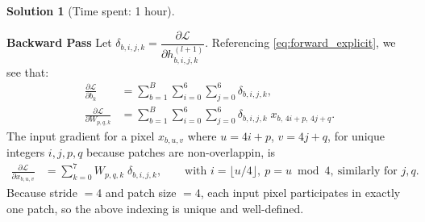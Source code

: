 \documentclass[11pt, reqno, letterpaper, twoside]{amsart}
\theoremstyle{plain}
\theoremstyle{definition}
\newtheorem{solution}[theorem]{Solution}
\begin{document}
\begin{solution}[Time spent: 1 hour]
\begin{enumerate}
\noindent \textbf{Backward Pass }
Let $\delta_{b,i,j,k}=\dfrac{\partial \mathcal{L}}{\partial h^{(l+1)}_{b,i,j,k}}$. Referencing \eqref{eq:forward_explicit}, we see that: 
\begin{align}
\frac{\partial \mathcal{L}}{\partial b_k}
&= \sum_{b=1}^{B}\sum_{i=0}^{6}\sum_{j=0}^{6} \delta_{b,i,j,k}, \label{eq:grad_b}\\[6pt]
\frac{\partial \mathcal{L}}{\partial W_{p,q,k}}
&= \sum_{b=1}^{B}\sum_{i=0}^{6}\sum_{j=0}^{6} \delta_{b,i,j,k} \; x_{b,\,4i+p,\,4j+q}. \label{eq:grad_w}
\end{align}
The input gradient for a pixel $x_{b,u,v}$ where $u=4i+p$, $v=4j+q$, for unique integers $i,j,p,q$ because patches are non-overlappin,  is
\begin{align}
\frac{\partial \mathcal{L}}{\partial x_{b,u,v}}
&= \sum_{k=0}^{7} W_{p,q,k}\; \delta_{b,i,j,k},\qquad\text{with } i=\lfloor u/4\rfloor,\ p = u \bmod 4,\ \text{similarly for } j,q.
\label{eq:grad_x}
\end{align}
Because stride $=4$ and patch size $=4$, each input pixel participates in exactly one patch, so the above indexing is unique and well-defined. \\


\end{enumerate}
\end{solution}
\end{document}
